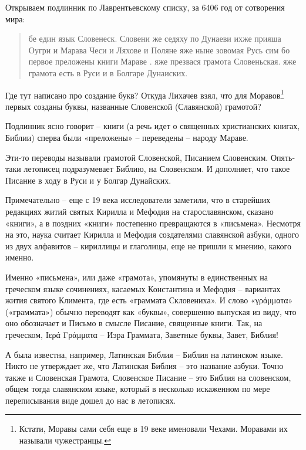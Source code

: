 \documentclass[a5paper,11pt,openany]{article}
\begin{document}
Открываем подлинник по Лаврентьевскому списку, за 6406 год от сотворения мира:

\begin{quotation}
бе един язык Словенеск. Словени же седяху по Дунаеви ихже прияша Оугри и Марава Чеси и Ляхове и Поляне яже ныне зовомая Русь сим бо первое преложены книги Мараве . яже презвася грамота Словеньская. яже грамота есть в Руси и в Болгаре Дунаиских.
\end{quotation}

Где тут написано про создание букв? Откуда Лихачев взял, что для Моравов\footnote{Кстати, Моравы сами себя еще в 19 веке именовали Чехами. Моравами их называли чужестранцы.} первых созданы буквы, названные Словенской (Славянской) грамотой?

Подлинник ясно говорит – книги (а речь идет о священных христианских книгах, Библии) сперва были «преложены» – переведены – народу Мараве. 

Эти-то переводы называли грамотой Словенской, Писанием Словенским. Опять-таки летописец подразумевает Библию, на Словенском. И дополняет, что такое Писание в ходу в Руси и у Болгар Дунайских. 

Примечательно – еще с 19 века исследователи заметили, что в старейших редакциях житий святых Кирилла и Мефодия на старославянском, сказано «книги», а в поздних «книги» постепенно превращаются в «письмена». Несмотря на это, наука считает Кирилла и Мефодия создателями славянской азбуки, одного из двух алфавитов – кириллицы и глаголицы, еще не пришли к мнению, какого именно. 


Именно «письмена», или даже «грамота», упомянуты в единственных на греческом языке сочинениях, касаемых Константина и Мефодия – вариантах жития святого Климента, где есть «граммата Скловениха». И слово «γράμματα» («граммата») обычно переводят как «буквы», совершенно выпуская из виду, что оно обозначает и Письмо в смысле Писание, священные книги. Так, на греческом, Iερά Γράμματα – Иэра Граммата, Заветные буквы, Завет, Библия!

А была известна, например, Латинская Библия – Библия на латинском языке. Никто не утверждает же, что Латинская Библия – это название азбуки. Точно также и Словенская Грамота, Словенское Писание – это Библия на словенском, общем тогда славянском языке, который в несколько искаженном по мере переписывания виде дошел до нас в летописях.
\end{document}
